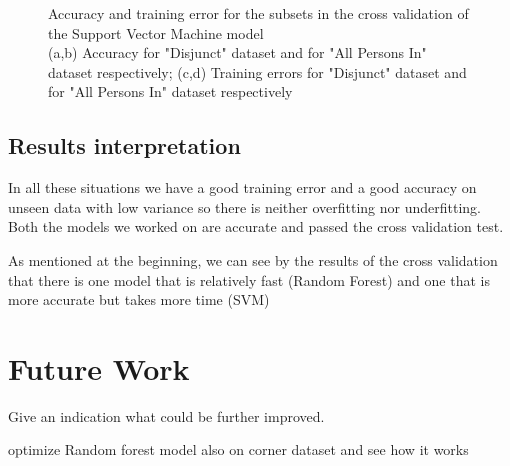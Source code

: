 \documentclass[conference]{IEEEtran}
\begin{document}
\begin{figure}[ht!]
    \caption{
        \color{baptiste}
        Accuracy and training error for the subsets in the cross validation of the Support Vector Machine model \\ 
        (a,b) Accuracy for "Disjunct" dataset and for "All Persons In" dataset respectively;
        (c,d) Training errors for "Disjunct" dataset and for "All Persons In" dataset respectively
    }
    \label{fig:hyper:cv_SVM}
\end{figure}

\subsection{Results interpretation}

\textcolor{baptiste}{In all these situations we have a good training error and a good accuracy on unseen data with low variance so there is neither overfitting nor underfitting. Both the models we worked on are accurate and passed the cross validation test.}

\textcolor{baptiste}{As mentioned at the beginning, we can see by the results of the cross validation that there is one model that is relatively fast (Random Forest) and one that is more accurate but takes more time (SVM)}

\section{Future Work}
Give an indication what could be further improved. 

optimize Random forest model also on corner dataset and see how it works


\end{document}

